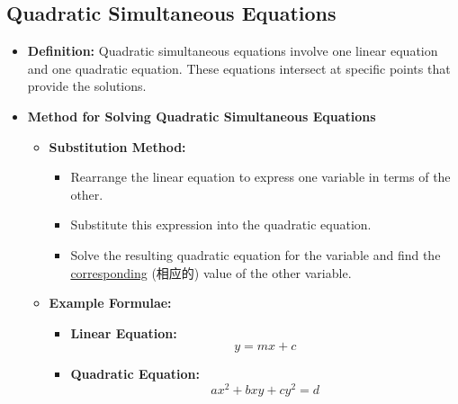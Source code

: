 
\subsection{Quadratic Simultaneous Equations}
\begin{itemize}
    \item \textbf{Definition:} Quadratic simultaneous equations involve one linear equation and one quadratic equation. These
    equations intersect at specific points that provide the solutions.
    \item \textbf{Method for Solving Quadratic Simultaneous Equations}
    \begin{itemize}
        \item \textbf{Substitution Method:}
        \begin{itemize}
            \item Rearrange the linear equation to express one variable in terms of the other.
            \item Substitute this expression into the quadratic equation.
            \item Solve the resulting quadratic equation for the variable and find the \underline{corresponding} (相应的) value of
            the other variable.
        \end{itemize}
        \item \textbf{Example Formulae:}
        \begin{itemize}
            \item \textbf{Linear Equation:}
            \begin{equation}
                y = mx + c
            \end{equation}
            \item \textbf{Quadratic Equation:}
            \begin{equation}
                ax^2 + bxy + cy^2 = d
            \end{equation}
        \end{itemize}
    \end{itemize}
\end{itemize}